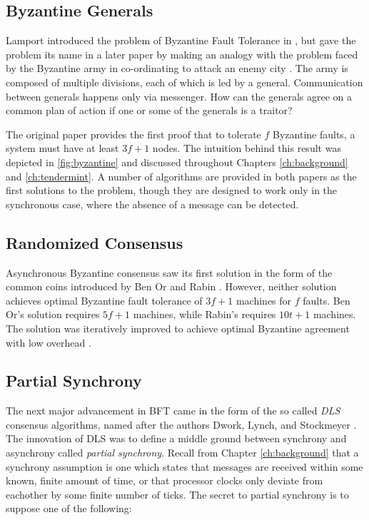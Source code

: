 \subsection{Byzantine Generals}

Lamport introduced the problem of Byzantine Fault Tolerance in \cite{pease1980reaching},
but gave the problem its name in a later paper by making an analogy with the problem faced
by the Byzantine army in co-ordinating to attack an enemy city \cite{lamport1982byzantine}.
The army is composed of multiple divisions, each of which is led by a general.
Communication between generals happens only via messenger.
How can the generals agree on a common plan of action if one or some of the generals is a traitor?

The original paper provides the first proof that to tolerate $f$ Byzantine faults,
a system must have at least $3f+1$ nodes. 
The intuition behind this result was depicted in \ref{fig:byzantine} and discussed 
throughout Chapters \ref{ch:background} and \ref{ch:tendermint}.
A number of algorithms are provided in both papers as the first solutions to the problem,
though they are designed to work only in the synchronous case, where the absence of a message can be detected.

\subsection{Randomized Consensus}

Asynchronous Byzantine consensus saw its first solution in the form of the common coins
introduced by Ben Or \cite{free-choice} and Rabin \cite{rabin1983randomized}.
However, neither solution achieves optimal Byzantine fault tolerance of $3f+1$ machines for $f$ faults.
Ben Or's solution requires $5f+1$ machines, while Rabin's requires $10t+1$ machines.
The solution was iteratively improved to achieve optimal Byzantine agreement with low overhead \cite{feldman1988optimal,canetti1993fast,cachin2000random}.

\subsection{Partial Synchrony}

The next major advancement in BFT came in the form of the so called \emph{DLS} consensus algorithms,
named after the authors Dwork, Lynch, and Stockmeyer \cite{dls}.
The innovation of DLS was to define a middle ground between synchrony and asynchrony called \emph{partial synchrony}.
Recall from Chapter \ref{ch:background} that a synchrony assumption is one which states that messages 
are received within some known, finite amount of time, 
or that processor clocks only deviate from eachother by some finite number of ticks.
The secret to partial synchrony is to suppose one of the following:

